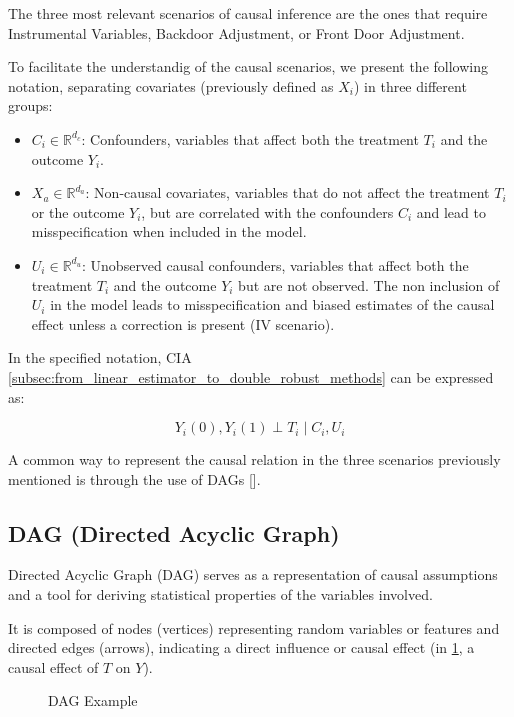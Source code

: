 \documentclass{article}
\numberwithin{equation}{section}
\begin{document}
The three most relevant scenarios of causal inference are the ones that require Instrumental Variables, Backdoor Adjustment, or Front Door Adjustment.

To facilitate the understandig of the causal scenarios, we present the following notation, separating covariates (previously defined as $X_i$) in three different groups:
\begin{itemize}
    \item $C_i \in \mathbb{R}^{d_c}$: Confounders, variables that affect both the treatment $T_i$ and the outcome $Y_i$.
    \item $X_a \in \mathbb{R}^{d_a}$: Non-causal covariates, variables that do not affect the treatment $T_i$ or the outcome $Y_i$, but are correlated with the confounders $C_i$ and lead to misspecification when included in the model.
    \item $U_i \in \mathbb{R}^{d_u}$: Unobserved causal confounders, variables that affect both the treatment $T_i$ and the outcome $Y_i$ but are not observed. The non inclusion of $U_i$ in the model leads to misspecification and biased estimates of the causal effect unless a correction is present (IV scenario).
\end{itemize}

In the specified notation, CIA \eqref{subsec:from_linear_estimator_to_double_robust_methods} can be expressed as:

\begin{equation}
    Y_i(0), Y_i(1) \perp T_i \mid C_i, U_i
\end{equation}

A common way to represent the causal relation in the three scenarios previously mentioned is through the use of DAGs [\cite{Pearl1995}].

\subsection{DAG (Directed Acyclic Graph)}

Directed Acyclic Graph (DAG) serves as a representation of causal assumptions and a tool for deriving statistical properties of the variables involved.

It is composed of nodes (vertices) representing random variables or features and directed edges (arrows), indicating a direct influence or causal effect (in \ref{fig:dag_example}, a causal effect of $T$ on $Y$).

\begin{figure}[H]
    \centering
    \caption{DAG Example}
    \label{fig:dag_example}
\end{figure}
\end{document}
